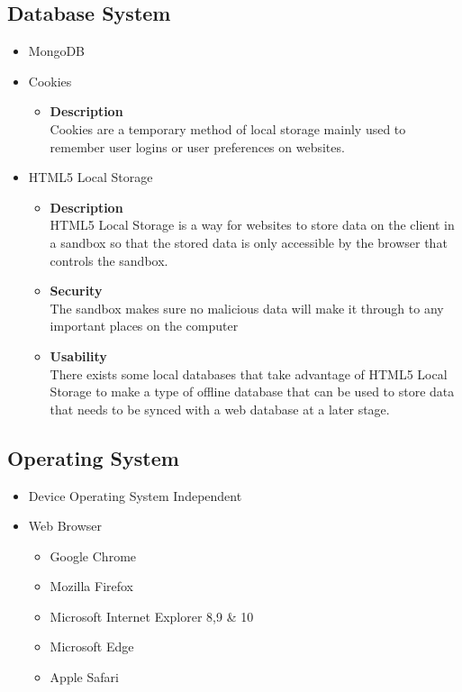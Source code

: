 \documentclass[11pt,fleqn]{book} %
\begin{document}
	\subsection{Database System}
	\begin{itemize}
		\item MongoDB
		\item Cookies
		\begin{itemize}
			\item \textbf{Description}\\
			Cookies are a temporary method of local storage mainly used to remember user logins or user preferences on websites.
		\end{itemize}
		\item HTML5 Local Storage
		\begin{itemize}
			\item \textbf{Description}\\
			HTML5 Local Storage is a way for websites to store data on the client in a sandbox so that the stored data is only accessible by the browser that controls the sandbox.
			\item \textbf{Security}\\
			The sandbox makes sure no malicious data will make it through to any important places on the computer
			\item \textbf{Usability}\\
			There exists some local databases that take advantage of HTML5 Local Storage to make a type of offline database that can be used to store data that needs to be synced with a web database at a later stage.
		\end{itemize}
	\end{itemize}
	\subsection{Operating System}
	\begin{itemize}
		\item Device Operating System Independent
		\item Web Browser
		\begin{itemize}
			\item Google Chrome
			\item Mozilla Firefox
			\item Microsoft Internet Explorer 8,9 \& 10
			\item Microsoft Edge
			\item Apple Safari
		\end{itemize}
	\end{itemize}
\end{document}
